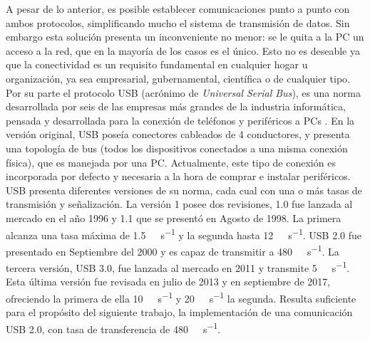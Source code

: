 A pesar de lo anterior, es posible establecer comunicaciones punto a punto con ambos protocolos, simplificando mucho el sistema de transmisión de datos. Sin embargo esta solución presenta un inconveniente no menor: se le quita a la PC un acceso a la red, que en la mayoría de los casos es el único. Esto no es deseable ya que la conectividad es un requisito fundamental en cualquier hogar u organización, ya sea empresarial, gubernamental, científica o de cualquier tipo.\\

Por su parte el protocolo USB (acrónimo de {\it Universal Serial Bus}), es una norma desarrollada por seis de las empresas más grandes de la industria informática, pensada y desarrollada para la conexión de teléfonos y periféricos a PCs \cite{USBspec}. En la versión original, USB poseía conectores cableados de 4 conductores, y presenta una topología de bus (todos los dispositivos conectados a una misma conexión física), que es manejada por una PC. Actualmente, este tipo de conexión es incorporada por defecto y necesaria a la hora de comprar e instalar periféricos.\\

USB presenta diferentes versiones de su norma, cada cual con una o más tasas de transmisión y señalización. La versión 1 posee dos revisiones, 1.0 fue lanzada al mercado en el año 1996 y 1.1 que se presentó en Agosto de 1998. La primera alcanza una tasa máxima de \SI{1.5}{\mega\bit\per\second} y la segunda hasta \SI{12}{\mega\bit\per\second}. USB 2.0 fue presentado en Septiembre del 2000 y es capaz de transmitir a \SI{480}{\mega\bit\per\second}. La tercera versión, USB 3.0, fue lanzada al mercado en 2011 y transmite \SI{5}{\giga\bit\per\second}. Esta última versión fue revisada en julio de 2013 y en septiembre de 2017, ofreciendo la primera de ella \SI{10}{\giga\bit\per\second} y \SI{20}{\giga\bit\per\second} la segunda. Resulta suficiente para el propósito del siguiente trabajo, la implementación de una comunicación USB 2.0, con tasa de transferencia de \SI{480}{\mega\bit\per\second}.\\

